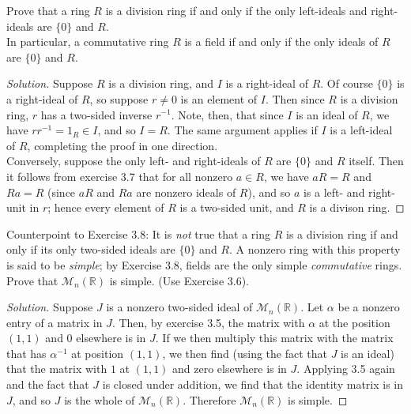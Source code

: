 \documentclass[12pt]{article}
\newenvironment{problem}[2][Problem]{\begin{trivlist}
\item[\hskip \labelsep {\bfseries #1}\hskip \labelsep {\bfseries #2.}]}{\end{trivlist}}
\newenvironment{solution}
  {\renewcommand\qedsymbol{$\blacksquare$}\begin{proof}[Solution]}
{\end{proof}}
\theoremstyle{remark}
\begin{document}
\begin{problem}{3.8}
  Prove that a ring $R$ is a division ring if and only if the only
  left-ideals and right-ideals are $\{0\}$ and $R$.\\
  \indent In particular, a commutative ring $R$ is a field if and 
  only if the only ideals of $R$ are $\{0\}$ and $R$.
\end{problem}
\begin{solution}
  Suppose $R$ is a division ring, and $I$ is a right-ideal of $R$.
  Of course $\{0\}$ is a right-ideal of $R$, so suppose $r\neq0$ is an
  element of $I$.
  Then since $R$ is a division ring, $r$ has a two-sided inverse
  $r^{-1}$.
  Note, then, that since $I$ is an ideal of $R$, we have 
  $rr^{-1}=1_R\in I$, and so $I=R$. The same argument applies
  if $I$ is a left-ideal of $R$, completing the proof in one direction.\\
  \indent Conversely, suppose the only left- and right-ideals of $R$
  are $\{0\}$ and $R$ itself.
  Then it follows from exercise 3.7 that for all nonzero $a\in R$,
  we have $aR = R$ and $Ra = R$ (since $aR$ and $Ra$ are nonzero 
  ideals of $R$), and so $a$ is a left- and right-unit in $r$;
  hence every element of $R$ is a two-sided unit, and $R$ is
  a divison ring.
\end{solution}

\begin{problem}{3.9}
  Counterpoint to Exercise 3.8: It is \textit{not} true that a ring
  $R$ is a division ring if and only if its only two-sided ideals
  are $\{0\}$ and $R$.
  A nonzero ring with this property is said to be \textit{simple};
  by Exercise 3.8, fields are the only simple \textit{commutative}
  rings.\\
  \indent Prove that $\mathcal{M}_n(\mathbb{R})$ is simple. 
  (Use Exercise 3.6).
\end{problem}
\begin{solution}
  Suppose $J$ is a nonzero two-sided ideal of $\mathcal{M}_n(\mathbb{R})$.
  Let $\alpha$ be a nonzero entry of a matrix in $J$.
  Then, by exercise 3.5, the matrix with $\alpha$ at the position
  $(1,1)$ and $0$ elsewhere is in $J$.
  If we then multiply this matrix with the matrix that has $\alpha^{-1}$
  at position $(1,1)$, we then find (using the fact that $J$ is an ideal)
  that the matrix with $1$ at $(1,1)$ and zero elsewhere is in $J$.
  Applying 3.5 again and the fact that $J$ is closed under addition,
  we find that the identity matrix is in $J$, and so $J$ is the whole of 
  $\mathcal{M}_n(\mathbb{R})$.
  Therefore $\mathcal{M}_n(\mathbb{R})$ is simple.
\end{solution}
\end{document}
